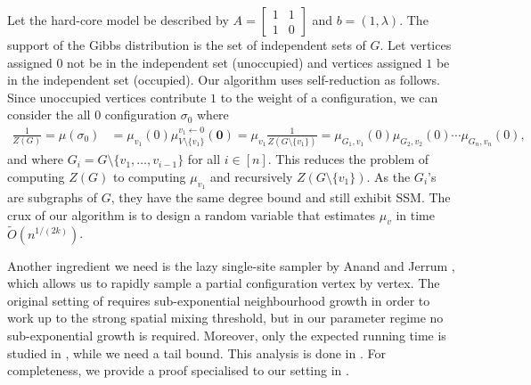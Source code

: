 \documentclass[11pt,a4paper]{amsart}
\theoremstyle{definition}
\theoremstyle{remark}
\begin{document}
Let the hard-core model be described by $A=\begin{bmatrix}1&1\\1&0\end{bmatrix}$ and $b=(1,\lambda)$.
The support of the Gibbs distribution is the set of independent sets of $G$. 
Let vertices assigned $0$ not be in the independent set (unoccupied) and vertices assigned $1$ be in the independent set (occupied). 
Our algorithm uses self-reduction \cite{JVV86} as follows.
Since unoccupied vertices contribute $1$ to the weight of a configuration, we can consider the all $0$ configuration $\sigma_0$ where 
\begin{align}
\label{hardcore-reduction}
\frac{1}{Z(G)}=\mu(\sigma_0)&=\mu_{v_1}(0)\mu_{V\setminus\{v_1\}}^{v_1\leftarrow0}(\mathbf{0})
=\mu_{v_1}\frac{1}{Z(G\setminus\{v_1\})}
=\mu_{G_1,v_1}(0)\mu_{G_2,v_2}(0)\cdots\mu_{G_n,v_n}(0),
\end{align}
and where $G_i=G\setminus\{v_1,\ldots,v_{i-1}\}$ for all $i\in[n]$.
This reduces the problem of computing $Z(G)$ to computing $\mu_{v_1}$ and recursively $Z(G\setminus\{v_1\})$.
As the $G_i$'s are subgraphs of $G$, they have the same degree bound and still exhibit SSM.
The crux of our algorithm is to design a random variable that estimates $\mu_{v}$ in time $\widetilde{O}(n^{1/(2k)})$.



Another ingredient we need is the lazy single-site sampler by Anand and Jerrum \cite{AJ22},
which allows us to rapidly sample a partial configuration vertex by vertex. 
The original setting of \cite{AJ22} requires sub-exponential neighbourhood growth in order to work up to the strong spatial mixing threshold, but in our parameter regime no sub-exponential growth is required. 
Moreover, only the expected running time is studied in \cite{AJ22}, while we need a tail bound. 
This analysis is done in \cite[Appendix B]{FGWWY22}. 
For completeness, we provide a proof specialised to our setting in .
\end{document}
